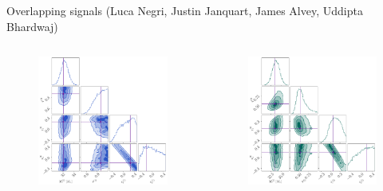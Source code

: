 \documentclass[usenames,dvipsnames,t]{beamer}
\begin{document}
\begin{frame}{Overlapping signals \tiny (Luca Negri, Justin Janquart, James Alvey, Uddipta Bhardwaj) \normalsize}
{    \begin{columns}
      \begin{column}{0.49\textwidth}
        \begin{figure}
          \centering
          \includegraphics[width=0.85\linewidth]{Figures/OS_injection_139_v2_1_cornerplot_M_c_q_s1_z_s2_z.pdf}
        \end{figure}
      \end{column}

      \begin{column}{0.49\textwidth}
        \begin{figure}
          \centering
          \includegraphics[width=0.85\linewidth]{Figures/OS_injection_139_v2_2_cornerplot_M_c_q_s1_z_s2_z.pdf}
        \end{figure}
      \end{column}
    \end{columns}
  }
\end{frame}
\end{document}
